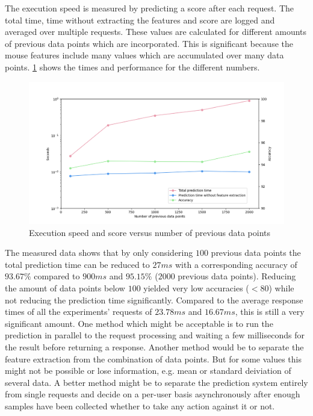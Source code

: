 \documentclass[
    fontsize=12pt,
    headings=small,
    parskip=half,           %
    bibliography=totoc,
    numbers=noenddot,       %
    open=any,               %
    final                   %
]{scrreprt}
\begin{document}
The execution speed is measured by predicting a score after each request. The total time, time without extracting the features and score are logged and averaged over multiple requests. These values are calculated for different amounts of previous data points which are incorporated. This is significant because the mouse features include many values which are accumulated over many data points. \ref{fig:speed_per_dp_count} shows the times and performance for the different numbers.

\begin{figure}[h]
	\includegraphics[width=\textwidth]{figures/speed_per_dp_count.png}
	\caption{Execution speed and score versus number of previous data points}
	\label{fig:speed_per_dp_count}
\end{figure}

The measured data shows that by only considering $100$ previous data points the total prediction time can be reduced to $27ms$ with a corresponding accuracy of $93.67\%$ compared to $900ms$ and $95.15\%$ ($2000$ previous data points). Reducing the amount of data points below $100$ yielded very low accuracies ($<80$) while not reducing the prediction time significantly. Compared to the average response times of all the experiments' requests of $23.78ms$ and $16.67ms$, this is still a very significant amount. One method which might be acceptable is to run the prediction in parallel to the request processing and waiting a few milliseconds for the result before returning a response. Another method would be to separate the feature extraction from the combination of data points. But for some values this might not be possible or lose information, e.g. mean or standard deiviation of several data.
A better method might be to separate the prediction system entirely from single requests and decide on a per-user basis asynchronously after enough samples have been collected whether to take any action against it or not.
\end{document}
